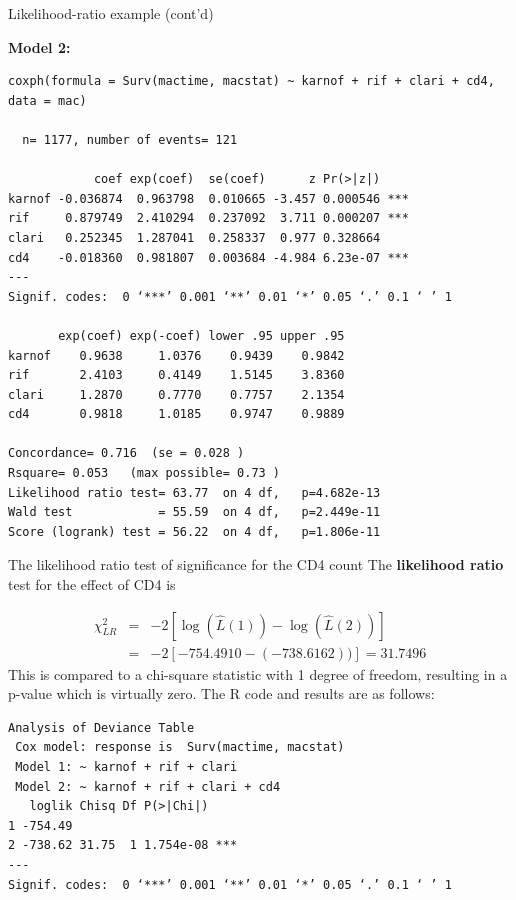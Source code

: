 \documentclass[envcountsect, 10pt, portrait, palatino]{beamer}
\begin{document}
\begin{frame}[fragile]{Likelihood-ratio example (cont'd)}

{\bf Model 2:}

\scriptsize
\begin{verbatim}
coxph(formula = Surv(mactime, macstat) ~ karnof + rif + clari + cd4, data = mac)

  n= 1177, number of events= 121

            coef exp(coef)  se(coef)      z Pr(>|z|)
karnof -0.036874  0.963798  0.010665 -3.457 0.000546 ***
rif     0.879749  2.410294  0.237092  3.711 0.000207 ***
clari   0.252345  1.287041  0.258337  0.977 0.328664
cd4    -0.018360  0.981807  0.003684 -4.984 6.23e-07 ***
---
Signif. codes:  0 ‘***’ 0.001 ‘**’ 0.01 ‘*’ 0.05 ‘.’ 0.1 ‘ ’ 1

       exp(coef) exp(-coef) lower .95 upper .95
karnof    0.9638     1.0376    0.9439    0.9842
rif       2.4103     0.4149    1.5145    3.8360
clari     1.2870     0.7770    0.7757    2.1354
cd4       0.9818     1.0185    0.9747    0.9889

Concordance= 0.716  (se = 0.028 )
Rsquare= 0.053   (max possible= 0.73 )
Likelihood ratio test= 63.77  on 4 df,   p=4.682e-13
Wald test            = 55.59  on 4 df,   p=2.449e-11
Score (logrank) test = 56.22  on 4 df,   p=1.806e-11
\end{verbatim}
\end{frame}
\begin{frame}[fragile]{The likelihood ratio test of significance for the CD4 count}
The {\bf likelihood ratio} test for the effect of CD4 is 

\begin{eqnarray*}
\chi^2_{LR} & = & -2 \left[\log(\hat{L}(1))- \log(\hat{L}(2))\right]\\
            & = & -2 \left[-754.4910- (-738.6162 ))\right]=31.7496
\end{eqnarray*}
This is compared to a chi-square statistic with 1 degree of freedom, resulting in a p-value which is virtually zero.  The R code and results are as follows:

\small
\begin{verbatim}
Analysis of Deviance Table
 Cox model: response is  Surv(mactime, macstat)
 Model 1: ~ karnof + rif + clari
 Model 2: ~ karnof + rif + clari + cd4
   loglik Chisq Df P(>|Chi|)
1 -754.49
2 -738.62 31.75  1 1.754e-08 ***
---
Signif. codes:  0 ‘***’ 0.001 ‘**’ 0.01 ‘*’ 0.05 ‘.’ 0.1 ‘ ’ 1
\end{verbatim}
\end{frame}
\end{document}

